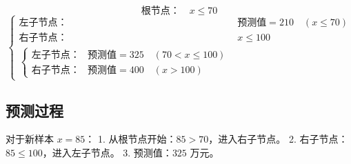 \documentclass{article}
\begin{document}
\[
\text{根节点：} \quad x \leq 70
\]
\[
\begin{cases}
\text{左子节点：} & \text{预测值} = 210 \quad (x \leq 70) \\
\text{右子节点：} & x \leq 100 \\
\begin{cases}
\text{左子节点：} & \text{预测值} = 325 \quad (70 < x \leq 100) \\
\text{右子节点：} & \text{预测值} = 400 \quad (x > 100)
\end{cases}
\end{cases}
\]

\subsection{预测过程}
对于新样本 $x = 85$：
1. 从根节点开始：$85 > 70$，进入右子节点。
2. 右子节点：$85 \leq 100$，进入左子节点。
3. 预测值：$325$ 万元。
\end{document}
